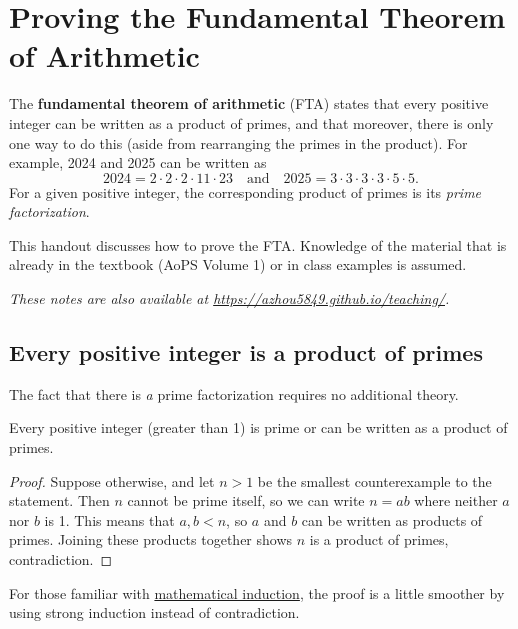 \section{Proving the Fundamental Theorem of Arithmetic}

The \textbf{fundamental theorem of arithmetic} (FTA) states that every positive integer can be written as a product of primes, and that moreover, there is only one way to do this (aside from rearranging the primes in the product). For example, 2024 and 2025 can be written as
\begin{equation*}
2024 = 2\cdot 2\cdot 2\cdot 11\cdot 23\quad\text{and}\quad 2025 = 3\cdot 3\cdot 3\cdot 3\cdot 5\cdot 5.
\end{equation*}
For a given positive integer, the corresponding product of primes is its \emph{prime factorization}.

This handout discusses how to prove the FTA. Knowledge of the material that is already in the textbook (AoPS Volume 1) or in class examples is assumed.

\textit{These notes are also available at \url{https://azhou5849.github.io/teaching/}.}


\subsection{Every positive integer is a product of primes}

The fact that there is \textit{a} prime factorization requires no additional theory.

\begin{theorem}
Every positive integer (greater than 1) is prime or can be written as a product of primes.
\end{theorem}
\begin{proof}
Suppose otherwise, and let $n > 1$ be the smallest counterexample to the statement. Then $n$ cannot be prime itself, so we can write $n = ab$ where neither $a$ nor $b$ is 1. This means that $a,b < n$, so $a$ and $b$ can be written as products of primes. Joining these products together shows $n$ is a product of primes, contradiction.
\end{proof}

\begin{remark}
For those familiar with \href{https://en.wikipedia.org/wiki/Mathematical_induction}{mathematical induction}, the proof is a little smoother by using strong induction instead of contradiction.
\end{remark}

